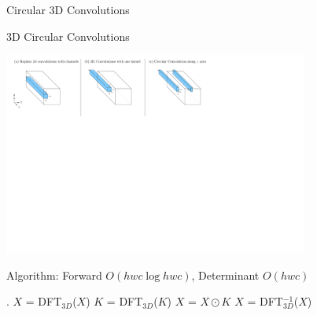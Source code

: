 \begin{frame}[standout]
	Circular 3D Convolutions
\end{frame}

\begin{frame}{3D Circular Convolutions}
    \begin{center}
    	\includegraphics[width=0.75\textwidth,page=3]{convolutions_wpurple.pdf}	
    \end{center}

    \alert{Algorithm:} Forward $O(hwc \log hwc)$, Determinant $O(hwc)$
    \begin{algorithmic}[1]
		.
		\STATE $X$ = DFT$_{3D}$($X$) 
		\STATE $K$ = DFT$_{3D}$($K$)
		\STATE $X$ = $X \odot  K$  
		\STATE $X$ = DFT$_{3D}^{-1}$($X$) 
	\end{algorithmic}
\end{frame}

